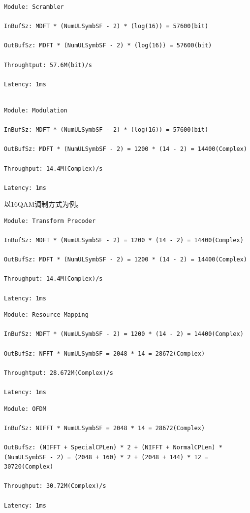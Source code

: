 \documentclass[titlepage]{article}
\numberwithin{figure}{section}
\numberwithin{equation}{section}
\begin{document}
\begin{verbatim}
Module: Scrambler

InBufSz: MDFT * (NumULSymbSF - 2) * (log(16)) = 57600(bit)

OutBufSz: MDFT * (NumULSymbSF - 2) * (log(16)) = 57600(bit)

Throughtput: 57.6M(bit)/s

Latency: 1ms
\end{verbatim}

\begin{verbatim}

Module: Modulation

InBufSz: MDFT * (NumULSymbSF - 2) * (log(16)) = 57600(bit)

OutBufSz: MDFT * (NumULSymbSF - 2) = 1200 * (14 - 2) = 14400(Complex)

Throughput: 14.4M(Complex)/s

Latency: 1ms

\end{verbatim}

以16QAM调制方式为例。

\begin{verbatim}
Module: Transform Precoder

InBufSz: MDFT * (NumULSymbSF - 2) = 1200 * (14 - 2) = 14400(Complex)

OutBufSz: MDFT * (NumULSymbSF - 2) = 1200 * (14 - 2) = 14400(Complex)

Throughput: 14.4M(Complex)/s

Latency: 1ms

\end{verbatim}

\begin{verbatim}
Module: Resource Mapping

InBufSz: MDFT * (NumULSymbSF - 2) = 1200 * (14 - 2) = 14400(Complex)

OutBufSz: NFFT * NumULSymbSF = 2048 * 14 = 28672(Complex)

Throughtput: 28.672M(Complex)/s 

Latency: 1ms
\end{verbatim}

\begin{verbatim}
Module: OFDM

InBufSz: NIFFT * NumULSymbSF = 2048 * 14 = 28672(Complex)

OutBufSz: (NIFFT + SpecialCPLen) * 2 + (NIFFT + NormalCPLen) * (NumULSymbSF - 2) = (2048 + 160) * 2 + (2048 + 144) * 12 = 30720(Complex)

Throughput: 30.72M(Complex)/s

Latency: 1ms
\end{verbatim}
\end{document}
